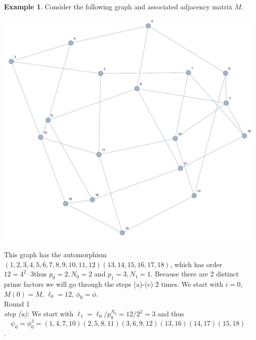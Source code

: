 \documentclass[preprint,12pt]{elsarticle}
\theoremstyle{definition}
\newtheorem{example}[thm]{Example}
\theoremstyle{remark}
\renewcommand{\emph}{\textit}
\begin{document}
\begin{example}
Consider the following graph and associated adjacency matrix $M$.\\
\begin{center}
\includegraphics[scale=.5]{ex2_0.pdf}
\end{center}
This graph has the automorphism $(1,2,3,4,5,6,7,8,9,10,11,12)(13,14,15,16,17,18)$, which has order $12= 4^2 \cdot 3$thus $p_0=2,N_0=2$ and $p_1=3,N_1=1$.  Because there are 2 distinct prime factors we will go through the steps (a)-(c) 2 times. We start with $i=0$, $M(0)=M$, $\ell_0=12$, $\phi_0=\phi$.\\
\noindent Round 1\\
\emph{step (a)}:  We start with $\ell_1=\ell_0/p_0^{N_0}=12/2^2=3$ and thus $$\psi_0=\phi_0^3=(1,4,7,10)(2,5,8,11)(3,6,9,12)(13,16)(14,17)(15,18)$$.\\

\end{example}
\end{document}
